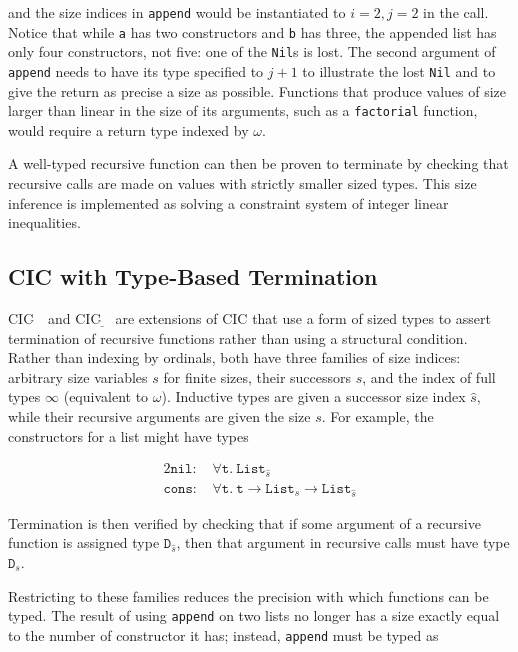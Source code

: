 \documentclass{article}
\newcommand{\CIChat}{CIC$\widehat{~}$\ }
\newcommand{\CIChatbar}{CIC$\widehat{\underline{~}}$\ }
\begin{document}
and the size indices in \texttt{append} would be instantiated to $i = 2, j = 2$ in the call. Notice that while \texttt{a} has two constructors and \texttt{b} has three, the appended list has only four constructors, not five: one of the \texttt{Nil}s is lost. The second argument of \texttt{append} needs to have its type specified to $j + 1$ to illustrate the lost \texttt{Nil} and to give the return as precise a size as possible. Functions that produce values of size larger than linear in the size of its arguments, such as a \texttt{factorial} function, would require a return type indexed by $\omega$.

A well-typed recursive function can then be proven to terminate by checking that recursive calls are made on values with strictly smaller sized types. This size inference is implemented as solving a constraint system of integer linear inequalities.

\subsection{CIC with Type-Based Termination}
\CIChat \cite{gregoire} and \CIChatbar \cite{sacchini} are extensions of CIC that use a form of sized types to assert termination of recursive functions rather than using a structural condition. Rather than indexing by ordinals, both have three families of size indices: arbitrary size variables $s$ for finite sizes, their successors $\hat{s}$, and the index of full types $\infty$ (equivalent to $\omega$). Inductive types are given a successor size index $\hat{s}$, while their recursive arguments are given the size $s$. For example, the constructors for a list might have types 

\begin{alignat*}{2}
\texttt{nil: }  &\forall \texttt{t}.\ \texttt{List}_{\hat{s}}\\
\texttt{cons: } &\forall \texttt{t}.\ \texttt{t} \rightarrow \texttt{List}_{s} \rightarrow \texttt{List}_{\hat{s}}
\end{alignat*}

Termination is then verified by checking that if some argument of a recursive function is assigned type $\texttt{D}_{\hat{s}}$, then that argument in recursive calls must have type $\texttt{D}_{s}$. 

Restricting to these families reduces the precision with which functions can be typed. The result of using \texttt{append} on two lists no longer has a size exactly equal to the number of constructor it has; instead, \texttt{append} must be typed as
\end{document}
